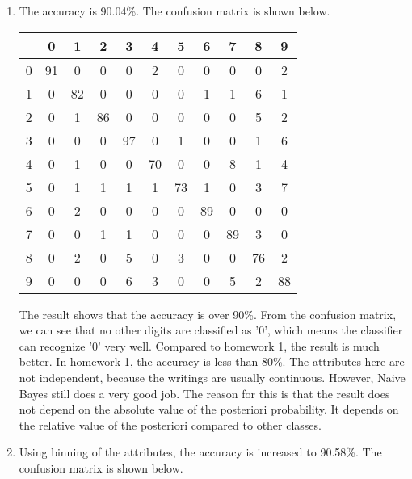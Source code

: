 \documentclass[11pt,letterpaper,oneside]{article}
\begin{document}
\begin{enumerate}
\begin{enumerate}
\begin{enumerate}
    \item The probability that a book with five stars and with ``Right" in its title is written by Democrat is shown below.

$P(Dem | FiveStar, ``Right") = P(Dem, FiveStar, ``Right")/P(FiveStar, ``Right") =  P(Dem)P(FiveStar | ``Right")P(``Right" | Dem)/P(FiveStar | ``Right")P(``Right" | Dem) = 30\% \times 80\% \times 90\% / 80\% \times 90\% = 30\%$
    \end{enumerate}

  \end{enumerate}

\item The accuracy is 90.04\%. The confusion matrix is shown below.

  \begin{tabular}{c|cccccccccc}
     & 0 & 1 & 2 & 3 & 4 & 5 & 6 & 7 & 8 & 9\\ \hline
   0 & 91&  0&  0&  0&  2&  0&  0&  0&  0&  2\\
   1 & 0& 82&  0&  0&  0&  0&  1&  1&  6&  1\\
   2 & 0&  1& 86&  0&  0&  0&  0&  0&  5&  2\\
   3 & 0&  0&  0& 97&  0&  1&  0&  0&  1&  6\\
   4 & 0&  1&  0&  0& 70&  0&  0&  8&  1&  4\\
   5 & 0&  1&  1&  1&  1& 73&  1&  0&  3&  7\\
   6 & 0&  2&  0&  0&  0&  0& 89&  0&  0&  0\\
   7 & 0&  0&  1&  1&  0&  0&  0& 89&  3&  0\\
   8 & 0&  2&  0&  5&  0&  3&  0&  0& 76&  2\\
   9 & 0&  0&  0&  6&  3&  0&  0&  5&  2& 88\\
  \end{tabular}

The result shows that the accuracy is over 90\%. From the confusion matrix, we can see that no other digits are classified as '0', which means the classifier can recognize '0' very well. Compared to homework 1, the result is much better. In homework 1, the accuracy is less than 80\%. The attributes here are not independent, because the writings are usually continuous. However, Naive Bayes still does a very good job. The reason for this is that the result does not depend on the absolute value of the posteriori probability. It depends on the relative value of the posteriori compared to other classes.

\item Using binning of the attributes, the accuracy is increased to 90.58\%. The confusion matrix is shown below.


\end{enumerate}
\end{document}
